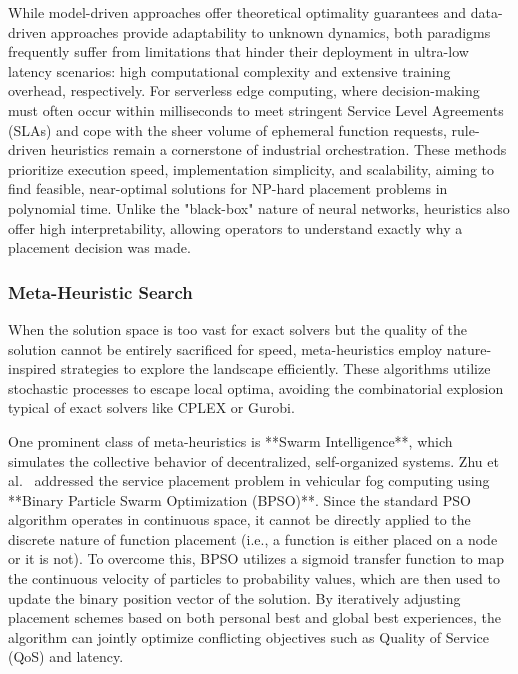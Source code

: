 \documentclass[lettersize,journal]{IEEEtran}
\begin{document}
While model-driven approaches offer theoretical optimality guarantees and data-driven approaches provide adaptability to unknown dynamics, both paradigms frequently suffer from limitations that hinder their deployment in ultra-low latency scenarios: high computational complexity and extensive training overhead, respectively. For serverless edge computing, where decision-making must often occur within milliseconds to meet stringent Service Level Agreements (SLAs) and cope with the sheer volume of ephemeral function requests, rule-driven heuristics remain a cornerstone of industrial orchestration. These methods prioritize execution speed, implementation simplicity, and scalability, aiming to find feasible, near-optimal solutions for NP-hard placement problems in polynomial time. Unlike the "black-box" nature of neural networks, heuristics also offer high interpretability, allowing operators to understand exactly why a placement decision was made.

\subsubsection{Meta-Heuristic Search}
When the solution space is too vast for exact solvers but the quality of the solution cannot be entirely sacrificed for speed, meta-heuristics employ nature-inspired strategies to explore the landscape efficiently. These algorithms utilize stochastic processes to escape local optima, avoiding the combinatorial explosion typical of exact solvers like CPLEX or Gurobi.

One prominent class of meta-heuristics is **Swarm Intelligence**, which simulates the collective behavior of decentralized, self-organized systems. Zhu et al.~\cite{zhu2019Folo} addressed the service placement problem in vehicular fog computing using **Binary Particle Swarm Optimization (BPSO)**. Since the standard PSO algorithm operates in continuous space, it cannot be directly applied to the discrete nature of function placement (i.e., a function is either placed on a node or it is not). To overcome this, BPSO utilizes a sigmoid transfer function to map the continuous velocity of particles to probability values, which are then used to update the binary position vector of the solution. By iteratively adjusting placement schemes based on both personal best and global best experiences, the algorithm can jointly optimize conflicting objectives such as Quality of Service (QoS) and latency.
\end{document}
